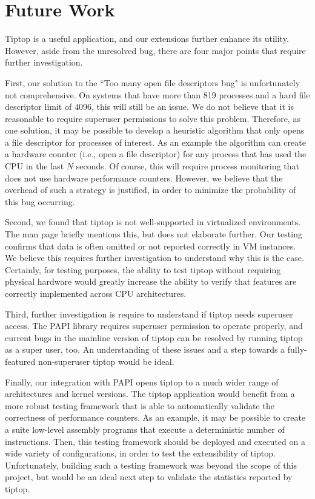 \section{Future Work}
\label{sec:conclusion}
Tiptop is a useful application, and our extensions further enhance its utility.
However, aside from the unresolved bug, there are four major points that require further investigation.

First, our solution to the ``Too many open file descriptors bug" is unfortunately not comprehensive. On systems that have more than 819 processes and a hard file descriptor limit of 4096, this will still be an issue.
We do not believe that it is reasonable to require superuser permissions to solve this problem.
Therefore, as one solution, it may be possible to develop a heuristic algorithm that only opens a file descriptor for processes of interest.
As an example the algorithm can create a hardware counter (i.e., open a file descriptor) for any process that has used the CPU in the last $N$ seconds.
Of course, this will require process monitoring that does not use hardware performance counters.
However, we believe that the overhead of such a strategy is justified, in order to minimize the probability of this bug occurring.

Second, we found that tiptop is not well-supported in virtualized environments.
The man page briefly mentions this, but does not elaborate further.
Our testing confirms that data is often omitted or not reported correctly in VM instances.
We believe this requires further investigation to understand why this is the case.
Certainly, for testing purposes, the ability to test tiptop without requiring physical hardware would greatly increase the ability to verify that features are correctly implemented across CPU architectures.

Third, further investigation is require to understand if tiptop needs superuser access.
The PAPI library requires superuser permission to operate properly, and current bugs in the mainline version of tiptop can be resolved by running tiptop as a super user, too.
An understanding of these issues and a step towards a fully-featured non-superuser tiptop would be ideal.

Finally, our integration with PAPI opens tiptop to a much wider range of architectures and kernel versions. The tiptop application would benefit from a more robust testing framework that is able to automatically validate the correctness of performance counters.
As an example, it may be possible to create a suite low-level assembly programs that execute a deterministic number of instructions.
Then, this testing framework should be deployed and executed on a wide variety of configurations, in order to test the extensibility of tiptop.
Unfortunately, building such a testing framework was beyond the scope of this project, but would be an ideal next step to validate the statistics reported by tiptop.